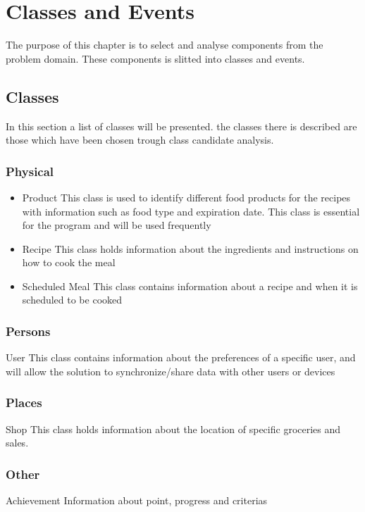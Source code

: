 \chapter{Classes and Events}
The purpose of this chapter is to select and analyse components from the problem domain. These components is slitted into classes and events.

\section{Classes}
In this section a list of classes will be presented. the classes there is described are those which have been chosen trough class candidate analysis.

\subsection{Physical}

\begin{itemize}
\item Product
	\subitem This class is used to identify different food products for the recipes with information such as food type and expiration date. This class is essential for the program and will be used frequently
\item Recipe
	\subitem This class holds information about the ingredients and instructions on how to cook the meal
\item Scheduled Meal
	\subitem This class contains information about a recipe and when it is scheduled to be cooked
\end{itemize}

\subsection{Persons}
\item User
	\subitem This class contains information about the preferences of a specific user, and will allow the solution to synchronize/share data with other users or devices
	
\subsection{Places}
\item Shop
	\subitem This class holds information about the location of specific groceries and sales.

\subsection{Other}
\item Achievement
	\subitem Information about point, progress and criterias %



